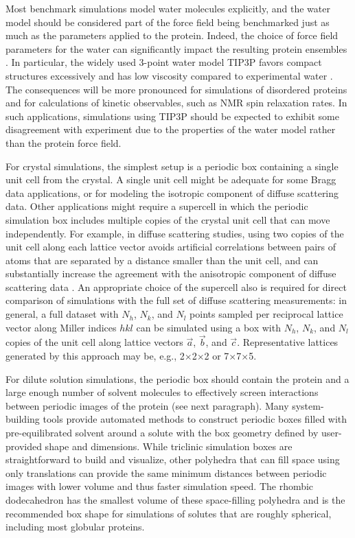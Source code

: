 \documentclass[9pt,review]{livecoms}
\begin{document}
Most benchmark simulations model water molecules explicitly, and the water model should be considered part of the force field being benchmarked just as much as the parameters applied to the protein.
Indeed, the choice of force field parameters for the water can significantly impact the resulting protein ensembles \cite{piana_water_2015,tian_ff19sb_2020,coppa_accelerated_2023}.
In particular, the widely used 3-point water model TIP3P \cite{jorgensen_comparison_1983} favors compact structures excessively \cite{tian_ff19sb_2020,coppa_accelerated_2023} and has low viscosity compared to experimental water \cite{kadaoluwa_pathirannahalage_systematic_2021}.
The consequences will be more pronounced for simulations of disordered proteins and for calculations of kinetic observables, such as NMR spin relaxation rates.
In such applications, simulations using TIP3P should be expected to exhibit some disagreement with experiment due to the properties of the water model rather than the protein force field.

For crystal simulations, the simplest setup is a periodic box containing a single unit cell from the crystal.
A single unit cell might be adequate for some Bragg data applications, or for modeling the isotropic component of diffuse scattering data. 
Other applications might require a supercell in which the periodic simulation box includes multiple copies of the crystal unit cell that can move independently.
For example, in diffuse scattering studies, using two copies of the unit cell along each lattice vector avoids artificial correlations between pairs of atoms that are separated by a distance smaller than the unit cell, and can substantially increase the agreement with the anisotropic component of diffuse scattering data \cite{wall_internal_2018}.
An appropriate choice of the supercell also is required for direct comparison of simulations with the full set of diffuse scattering measurements: in general, a full dataset with $N_h$, $N_k$, and $N_l$ points sampled per reciprocal lattice vector along Miller indices $hkl$ can be simulated using a box with $N_h$, $N_k$, and $N_l$ copies of the unit cell along lattice vectors $\vec{a}$, $\vec{b}$, and $\vec{c}$.
Representative lattices generated by this approach may be, e.g., 2$\times$2$\times$2 or 7$\times$7$\times$5.

For dilute solution simulations, the periodic box should contain the protein and a large enough number of solvent molecules to effectively screen interactions between periodic images of the protein (see next paragraph).
Many system-building tools provide automated methods to construct periodic boxes filled with pre-equilibrated solvent around a solute with the box geometry defined by user-provided shape and dimensions.
While triclinic simulation boxes are straightforward to build and visualize, other polyhedra that can fill space using only translations can provide the same minimum distances between periodic images with lower volume and thus faster simulation speed.
The rhombic dodecahedron \cite{wang_superposition_1972} has the smallest volume of these space-filling polyhedra and is the recommended box shape for simulations of solutes that are roughly spherical, including most globular proteins.
\end{document}

